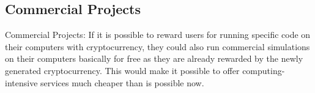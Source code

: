 \subsection{Commercial Projects}

Commercial Projects: If it is possible to reward users for running specific code on their computers with cryptocurrency, they could also run commercial simulations on their computers basically for free as they are already rewarded by the newly generated cryptocurrency. This would make it possible to offer computing-intensive services much cheaper than is possible now.

